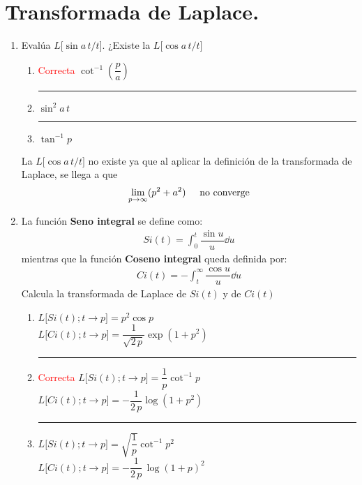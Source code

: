 \section{Transformada de Laplace.}
\begin{enumerate}
\item Evalúa $L \big[\sin a \, t/ t \big]$. ¿Existe la $L \big[\cos a \, t/ t \big]$
\begin{enumerate}[label=1.\alph*)]
\setlength\itemsep{2em}
\item \textcolor{red}{Correcta} $\cot^{-1} \left( \dfrac{p}{a}\right)$ \hrule
\item $\sin^{2} a \, t$ \hrule
\item $\tan^{-1} p$
\end{enumerate}
La $L \big[\cos a \, t/ t \big]$ no existe ya que al aplicar la definición de la transformada de Laplace, se llega a que
\begin{align*}
\lim_{p \to \infty} (p^{2} + a^{2}) \hspace{0.5cm} \mbox{no converge}
\end{align*}
\item La función \textbf{Seno integral} se define como:
\begin{align*}
Si(t) = \int_{0}^{t} \dfrac{\sin u }{u} \dd{u}
\end{align*}
mientras que la función \textbf{Coseno integral} queda definida por:
\begin{align*}
Ci(t) = - \int_{t}^{\infty} \dfrac{\cos u }{u} \dd{u}
\end{align*}
Calcula la transformada de Laplace de $Si(t)$ y de $Ci(t)$
\begin{enumerate}[label=2.\alph*)]
\setlength\itemsep{1.5em}
\item $L \big[Si(t);t \to p\big] = p^{2} \cos p$
\mbox{}\\$L \big[Ci(t);t \to p\big] = \dfrac{1}{\sqrt{2 \, p}} \exp(1 + p^{2})$ \hrule
\item \textcolor{red}{Correcta} $L \big[Si(t);t \to p\big] = \dfrac{1}{p} \cot^{-1} p$
\mbox{}\\$L \big[Ci(t);t \to p\big] = -\dfrac{1}{2 \, p} \log(1 + p^{2})$ \hrule
\item $L \big[Si(t);t \to p\big] = \sqrt{\dfrac{1}{p}} \cot^{-1} p^{2}$
\mbox{}\\$L \big[Ci(t);t \to p\big] = -\dfrac{1}{2 \, p} \, \log(1 + p)^{2}$
\end{enumerate}

\end{enumerate}
